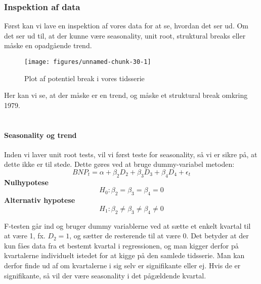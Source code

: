 \documentclass[
  10pt,
]{article}
\begin{document}
\hypertarget{inspektion-af-data}{%
\subsubsection{Inspektion af data}\label{inspektion-af-data}}

Først kan vi lave en inspektion af vores data for at se, hvordan det ser
ud. Om det ser ud til, at der kunne være seasonality, unit root,
struktural breaks eller måske en opadgående trend.

\begin{figure}[H]

{\centering \texttt{[image: figures/unnamed-chunk-30-1]} 

}

\caption{\label{fig:bnpbreak2}Plot af potentiel break i vores tidsserie}\label{fig:unnamed-chunk-30}
\end{figure}

Her kan vi se, at der måske er en trend, og måske et struktural break
omkring 1979.\\
~\\

\hypertarget{seasonality-og-trend}{%
\paragraph{Seasonality og trend}\label{seasonality-og-trend}}

\leavevmode

Inden vi laver unit root tests, vil vi først teste for seasonality, så
vi er sikre på, at dette ikke er til stede. Dette gøres ved at bruge
dummy-variabel metoden:
\[BNP_t = \alpha+\beta_2D_2+\beta_3D_3+\beta_4D_4+\epsilon_t\]
\textbf{Nulhypotese} \[
H_0 : \beta_2 = \beta_3 = \beta_4 = 0 
\tag{No seasonality} \] \textbf{Alternativ hypotese} \[
H_1 : \beta_2 \neq \beta_3 \neq \beta_4 \neq 0 
\tag{Seasonality} \]

F-testen går ind og bruger dummy variablerne ved at sætte et enkelt
kvartal til at være 1, fx. \(D_2=1\), og sætter de resterende til at
være 0. Det betyder at der kun fåes data fra et bestemt kvartal i
regressionen, og man kigger derfor på kvartalerne individuelt istedet
for at kigge på den samlede tidsserie. Man kan derfor finde ud af om
kvartalerne i sig selv er signifikante eller ej. Hvis de er
signifikante, så vil der være seasonality i det pågældende kvartal.
\end{document}
